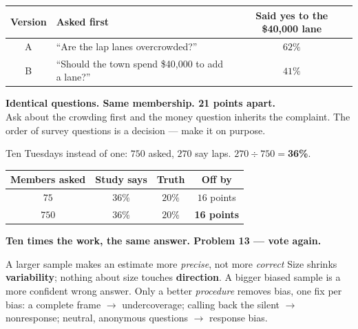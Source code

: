 \documentclass[aspectratio=169, 11pt]{beamer}
\newcommand{\redink}[1]{{\color{redacc}\bfseries #1}}
\begin{document}
\begin{frame}[t, plain]
  \vspace{0.3cm}
  \begin{center}
    \small
    \renewcommand{\arraystretch}{1.4}
    \begin{tabular}{@{} c l c @{}}
    \hline
    \textbf{Version} & \textbf{Asked first} & \textbf{Said yes to the \$40,000 lane} \\
    \hline
    A & ``Are the lap lanes overcrowded?'' & $62\%$ \\
    B & ``Should the town spend \$40,000 to add a lane?'' & $41\%$ \\
    \hline
    \end{tabular}
  \end{center}
  \vspace{0.6cm}
  \begin{center}
    {\color{cerulean}\bfseries Identical questions. Same membership. \redink{21 points apart.}}\\[8pt]
    {\small\color{slate} Ask about the crowding first and the money question inherits the
    complaint. The order of survey questions is a decision --- make it on purpose.}
  \end{center}
\end{frame}

\begin{frame}[t, plain]
  \vspace{2pt}
  Ten Tuesdays instead of one: $750$ asked, $270$ say laps. \quad $270 \div 750 = {}$\redink{36\%}.
  \begin{center}
    \small
    \renewcommand{\arraystretch}{1.15}
    \begin{tabular}{@{} c c c c @{}}
    \hline
    \textbf{Members asked} & \textbf{Study says} & \textbf{Truth} & \textbf{Off by} \\
    \hline
    $75$  & $36\%$ & $20\%$ & $16$ points \\
    $750$ & $36\%$ & $20\%$ & \redink{16 points} \\
    \hline
    \end{tabular}
  \end{center}
  \textbf{Ten times the work, the same answer. Problem 13 --- vote again.}
  \begin{block}{A larger sample makes an estimate more \emph{precise}, not more \emph{correct}}
    Size shrinks \textbf{variability}; nothing about size touches \textbf{direction}. A bigger
    biased sample is a more confident wrong answer. Only a better \emph{procedure} removes bias,
    one fix per bias: a complete frame $\to$ undercoverage; calling back the silent $\to$
    nonresponse; neutral, anonymous questions $\to$ response bias.
  \end{block}
\end{frame}
\end{document}
